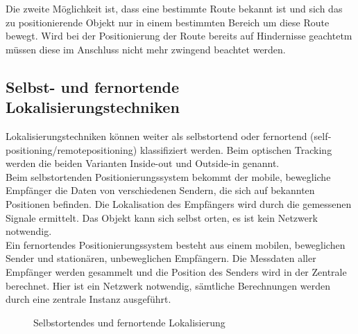     Die zweite Möglichkeit ist, dass eine bestimmte Route bekannt ist und sich das zu positionierende Objekt nur in einem bestimmten Bereich um diese Route bewegt.
    Wird bei der Positionierung der Route bereits auf Hindernisse geachtetm müssen diese im Anschluss nicht mehr zwingend beachtet werden.

    \subsection*{Selbst- und fernortende Lokalisierungstechniken}
    Lokalisierungstechniken können weiter als selbstortend oder fernortend (self­positioning/remote­positioning) klassifiziert werden. Beim optischen Tracking werden die beiden Varianten Inside-out und Outside-in genannt.\\
    Beim selbstortenden Positionierungssystem bekommt der mobile, bewegliche Empfänger die Daten von verschiedenen Sendern, die sich auf bekannten Positionen befinden. Die Lokalisation des Empfängers wird durch die gemessenen Signale ermittelt. Das Objekt kann sich selbst orten, es ist kein Netzwerk notwendig.\\
    Ein fernortendes Positionierungssystem besteht aus einem mobilen, beweglichen Sender und stationären, unbeweglichen Empfängern. Die Messdaten aller Empfänger werden gesammelt und die Position des Senders wird in der Zentrale berechnet. Hier ist ein Netzwerk notwendig, sämtliche Berechnungen werden durch eine zentrale Instanz ausgeführt.

    \begin{figure}[H]
      \begin{centering}
      \par\end{centering}
      \caption{Selbstortendes und fernortende Lokalisierung}
      \label{SelbstundFernortend}
    \end{figure}


